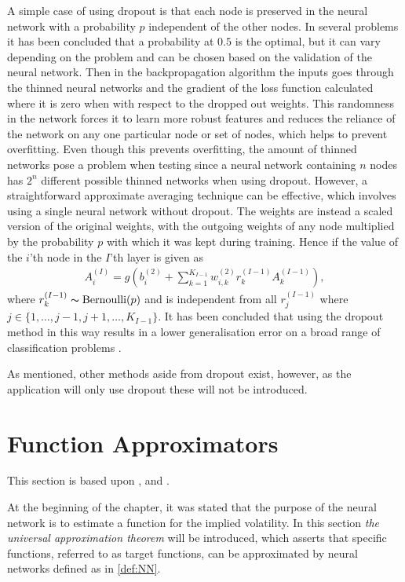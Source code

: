 A simple case of using dropout is that each node is preserved in the neural network with a probability $p$ independent of the other nodes. In several problems it has been concluded that a probability at $0.5$ is the optimal, but it can vary depending on the problem and can be chosen based on the validation of the neural network. Then in the backpropagation algorithm the inputs goes through the thinned neural networks and the gradient of the loss function calculated where it is zero when with respect to the dropped out weights. This randomness in the network forces it to learn more robust features and reduces the reliance of the network on any one particular node or set of nodes, which helps to prevent overfitting. Even though this prevents overfitting, the amount of thinned networks pose a problem when testing since a neural network containing $n$ nodes has $2^n$ different possible thinned networks when using dropout. However, a straightforward approximate averaging technique can be effective, which involves using a single neural network without dropout. The weights are instead a scaled version of the original weights, with the outgoing weights of any node multiplied by the probability $p$ with which it was kept during training. Hence if the value of the $i$'th node in the $I$'th layer is given as
\begin{align*}
    A^{(I)}_i = g\left(b_{i}^{(2)} + \sum_{k=1}^{K_{I-1}} w_{i,k}^{(2)}r_{k}^{(I-1)}A_{k}^{(I-1)}\right),
\end{align*}
where $r_{k}^{(I-1)} \thicksim \operatorname{Bernoulli}(p)$ and is independent from all $r_{j}^{(I-1)}$ where $j\in \{1,\ldots, j-1,j+1, \ldots, K_{I-1}\}$. It has been concluded that using the dropout method in this way results in a lower generalisation error on a broad range of classification problems \citep{Dropout}.

As mentioned, other methods aside from dropout exist, however, as the application will only use dropout these will not be introduced.


\section{Function Approximators}\label{sec:UAT}
This section is based upon \citep[p. 16-17]{Art}, \citep{Barron} and \citep{REOS}.

At the beginning of the chapter, it was stated that the purpose of the neural network is to estimate a function for the implied volatility. In this section \emph{the universal approximation theorem} will be introduced, which asserts that specific functions, referred to as target functions, can be approximated by neural networks defined as in \autoref{def:NN}. 

